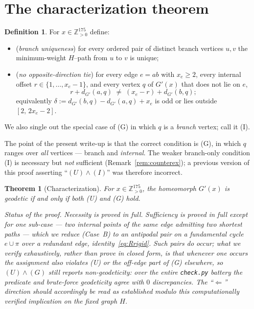 \documentclass{amsart}
\newtheorem{theorem}{Theorem}
\theoremstyle{definition}
\newtheorem{definition}{Definition}
\begin{document}
\section{The characterization theorem}

\begin{definition}\label{def:conditions}
For $x\in\mathbb Z_{>0}^{175}$ define:
\begin{itemize}
\item[\textnormal{(U)}] (\emph{branch uniqueness}) for every ordered pair of
distinct branch vertices $u,v$ the minimum-weight $H$--path from $u$ to $v$ is
unique;
\item[\textnormal{(G)}] (\emph{no opposite-direction tie}) for every edge
$e=ab$ with $x_e\ge2$, every internal offset $r\in\{1,\dots,x_e-1\}$, and every
vertex $q$ of $G'(x)$ that does not lie on $e$,
\[
 r+d_{G'}(a,q)\;\neq\;(x_e-r)+d_{G'}(b,q);
\]
equivalently $\delta:=d_{G'}(b,q)-d_{G'}(a,q)+x_e$ is odd or lies outside
$[2,\,2x_e-2]$.
\end{itemize}
We also single out the special case of \textnormal{(G)} in which $q$ is a
\emph{branch} vertex; call it \textnormal{(I)}.
\end{definition}

The point of the present write-up is that the correct condition is
\textnormal{(G)}, in which $q$ ranges over \emph{all} vertices --- branch and
\emph{internal}. The weaker branch-only condition \textnormal{(I)} is necessary
but \emph{not} sufficient (Remark~\ref{rem:counterex}); a previous version of
this proof asserting ``$(U)\wedge(I)$'' was therefore incorrect.

\begin{theorem}[Characterization]\label{thm:main}
For $x\in\mathbb Z_{>0}^{175}$, the homeomorph $G'(x)$ is geodetic if and only if
both \textnormal{(U)} and \textnormal{(G)} hold.

\emph{Status of the proof.} Necessity is proved in full. Sufficiency is proved in
full except for one sub-case --- two internal points of the \emph{same} edge
admitting two shortest paths --- which we reduce (Case~B) to an antipodal pair on
a fundamental cycle $e\cup\pi$ over a redundant edge, identity~\eqref{eq:Rrigid}.
Such pairs do occur; what we verify exhaustively, rather than prove in closed
form, is that whenever one occurs the assignment also violates (U) or the
off-edge part of (G) elsewhere, so $(U)\wedge(G)$ still reports non-geodeticity:
over the entire \texttt{check.py} battery the predicate and brute-force
geodeticity agree with $0$ discrepancies. The ``$\Leftarrow$'' direction should
accordingly be read as established modulo this computationally verified
implication on the fixed graph $H$.
\end{theorem}
\end{document}
